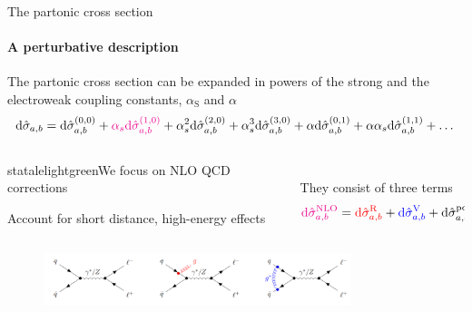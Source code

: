 \begin{frame} {The partonic cross section}
  \framesubtitle{A perturbative description}
\vspace{1em}
The partonic cross section can be expanded in powers of the strong and the electroweak coupling constants, $\alpha_{\text{S}}$ and $\alpha$
    \begin{equation*}
    \text{d} \hat{\sigma}_{a,b} = \text{d} \hat{\sigma}_{a,b}^{(0,0)} + \textcolor{magenta}{\alpha_s \text{d} \hat{\sigma}_{a,b}^{(1,0)}} + \alpha_s^2 \text{d} \hat{\sigma}_{a,b}^{(2,0)} + \alpha_s^3 \text{d} \hat{\sigma}_{a,b}^{(3,0)} + \alpha \text{d} \hat{\sigma}_{a,b}^{(0,1)} + \alpha \alpha_s \text{d} \hat{\sigma}_{a,b}^{(1,1)} + \dots 
    \end{equation*}

    \begin{columns}

    \begin{column}{0.6\textwidth}
    \begin{colorblock}[black]{statalelightgreen}{We focus on  NLO QCD corrections}
    \begin{center}
        Account for short distance, high-energy effects
    \end{center}
      \end{colorblock}   
    
    \end{column}

    \begin{column}{0.4\textwidth}
    \\
    They consist of three terms 
    \begin{equation*}
    \textcolor{magenta}{\mathrm{d} \hat{\sigma}_{a,b}^{\mathrm{NLO}}} = \textcolor{red}{\mathrm{d} \hat{\sigma}_{a,b}^{\mathrm{R}}} + \textcolor{blue}{\mathrm{d} \hat{\sigma}_{a,b}^{\mathrm{V}}} + \mathrm{d} \hat{\sigma}_{a,b}^{\mathrm{pdf}}
    \end{equation*}       
    
    \end{column}

    \end{columns}
    \begin{figure}
        \centering
        \includegraphics[width=0.8\textwidth]{imgs/real-and-virtual.png}
      \end{figure}    
\end{frame}




